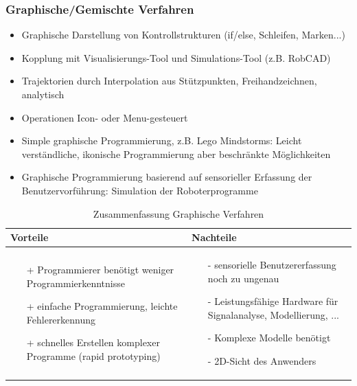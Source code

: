 \documentclass[11pt]{scrartcl}
\begin{document}
\subsubsection{Graphische/Gemischte Verfahren}
\begin{itemize}
\item Graphische Darstellung von Kontrollstrukturen (if/else, Schleifen,
Marken...)
\item Kopplung mit Visualisierungs-Tool und Simulations-Tool (z.B. RobCAD)
\item  Trajektorien durch Interpolation aus Stützpunkten, Freihandzeichnen,
analytisch
\item Operationen Icon- oder Menu-gesteuert
\item Simple graphische Programmierung, z.B. Lego Mindstorms:
Leicht verständliche, ikonische Programmierung aber beschränkte Möglichkeiten
\item Graphische Programmierung basierend auf sensorieller Erfassung der
Benutzervorführung: Simulation der Roboterprogramme
\end{itemize}
\begin{table}[hbt]
\centering
\begin{tabular}{|p{7.5cm}|p{7.5cm}|}
\hline
Vorteile & Nachteile\\
\hline
\vspace{-5mm}
\begin{itemize}
\setlength\itemsep{0em}
\item[+] Programmierer benötigt weniger Programmierkenntnisse
\item[+] einfache Programmierung, leichte Fehlererkennung
\item[+] schnelles Erstellen komplexer Programme (rapid prototyping)
\end{itemize}
 &
 \vspace{-5mm}
\begin{itemize}
\setlength\itemsep{0em}
\item[-] sensorielle Benutzererfassung noch zu ungenau
\item[-] Leistungsfähige Hardware für Signalanalyse, Modellierung, ...
\item[-] Komplexe Modelle benötigt
\item[-] 2D-Sicht des Anwenders
\end{itemize}\\
\hline
\end{tabular}
\caption{Zusammenfassung Graphische Verfahren}
\label{tab:textprog}
\end{table}
\end{document}
